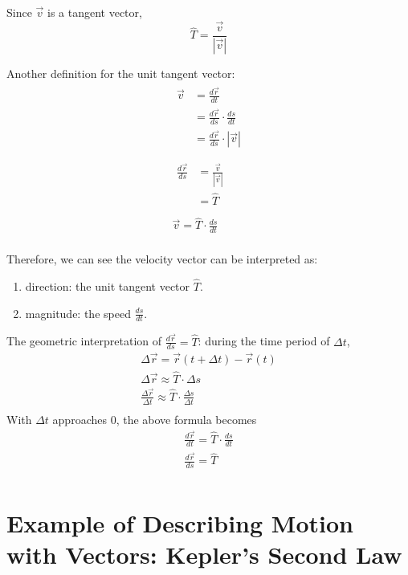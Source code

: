 \documentclass{article}
\begin{document}
Since $\vec{v}$ is a tangent vector,
\begin{equation*}
  \hat{T} = \frac{\vec{v}}{|\vec{v}|}
\end{equation*}

Another definition for the unit tangent vector:
\begin{gather*}
  \begin{split}
    \vec{v} &= \frac{d\vec{r}}{dt} \\
            &= \frac{d\vec{r}}{ds} \cdot \frac{ds}{dt} \\
            &= \frac{d\vec{r}}{ds} \cdot |\vec{v}| \\
  \end{split} \\
  \begin{split}
    \frac{d\vec{r}}{ds} &= \frac{\vec{v}}{|\vec{v}|} \\
                        &= \hat{T} \\
  \end{split} \\
  \vec{v} = \hat{T} \cdot \frac{ds}{dt} \\
\end{gather*}

Therefore, we can see the velocity vector can be interpreted as:
\begin{enumerate}
  \item direction: the unit tangent vector $\hat{T}$.
  \item magnitude: the speed $\frac{ds}{dt}$.
\end{enumerate}

The geometric interpretation of $\frac{d\vec{r}}{ds} = \hat{T}$: during the time 
period of $\Delta t$, 
\begin{gather*}
  \Delta \vec{r} = \vec{r}(t + \Delta t) - \vec{r}(t) \\
  \Delta \vec{r} \approx \hat{T} \cdot \Delta s \\
  \frac{\Delta \vec{r}}{\Delta t} \approx \hat{T} \cdot \frac{\Delta s}{\Delta t} \\
\end{gather*}
With $\Delta t$ approaches 0, the above formula becomes
\begin{gather*}
  \frac{d\vec{r}}{dt} = \hat{T} \cdot \frac{ds}{dt} \\
  \frac{d\vec{r}}{ds} = \hat{T} \\
\end{gather*}

\section{Example of Describing Motion with Vectors: Kepler's Second Law}
\end{document}
